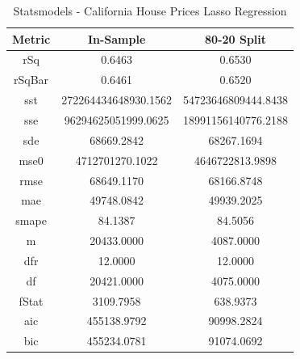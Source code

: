\documentclass{article}
\begin{document}
\begin{table}[H]
\centering
\caption{Statsmodels - California House Prices Lasso Regression}
\label{tab:Statsmodels - House Prices Lasso Regression}
\begin{tabular}{|c|c|c|}\hline
Metric & In-Sample & 80-20 Split \\ \hline \hline
rSq & 0.6463 & 0.6530 \\ \hline
rSqBar & 0.6461 & 0.6520 \\ \hline
sst & 272264434648930.1562 & 54723646809444.8438 \\ \hline
sse & 96294625051999.0625 & 18991156140776.2188 \\ \hline
sde & 68669.2842 & 68267.1694 \\ \hline
mse0 & 4712701270.1022 & 4646722813.9898 \\ \hline
rmse & 68649.1170 & 68166.8748 \\ \hline
mae & 49748.0842 & 49939.2025 \\ \hline
smape & 84.1387 & 84.5056 \\ \hline
m & 20433.0000 & 4087.0000 \\ \hline
dfr & 12.0000 & 12.0000 \\ \hline
df & 20421.0000 & 4075.0000 \\ \hline
fStat & 3109.7958 & 638.9373 \\ \hline
aic & 455138.9792 & 90998.2824 \\ \hline
bic & 455234.0781 & 91074.0692 \\ \hline
\end{tabular}
\end{table}
\end{document}

